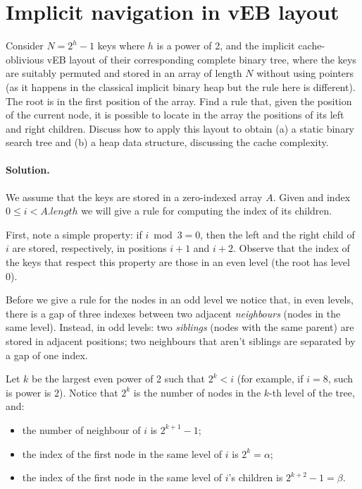 \section{Implicit navigation in vEB layout}
Consider $N = 2^h - 1$ keys where $h$ is a power of 2, and the implicit cache-oblivious vEB layout of their corresponding complete binary tree, where the keys are suitably permuted and stored in an array of length $N$ without using pointers (as it happens in the classical implicit binary heap but the rule here is different). The root is in the first position of the array. Find a rule that, given the position of the current node, it is possible to locate in the array the positions of its left and right children. Discuss how to apply this layout to obtain (a) a static binary search tree and (b) a heap data structure, discussing the cache complexity.

\vspace{0.5cm}
\paragraph{Solution.} We assume that the keys are stored in a zero-indexed array $A$. Given and index $0 \leq i < A.length$ we will give a rule for computing the index of its children.

\begin{center}
\end{center}

First, note a simple property: if $i \bmod 3 = 0$, then the left and the right child of $i$ are stored, respectively, in positions $i+1$ and $i+2$. Observe that the index of the keys that respect this property are those in an even level (the root has level 0).

Before we give a rule for the nodes in an odd level we notice that, in even levels, there is a gap of three indexes between two adjacent \emph{neighbours} (nodes in the same level). Instead, in odd levels: two \emph{siblings} (nodes with the same parent) are stored in adjacent positions; two neighbours that aren't siblings are separated by a gap of one index.

Let $k$ be the largest even power of 2 such that $2^k<i$ (for example, if $i=8$, such is power is $2$). Notice that $2^k$ is the number of nodes in the $k$-th level of the tree, and:
\begin{itemize}
  \item the number of neighbour of $i$ is $2^{k+1}-1$;
  \item the index of the first node in the same level of $i$ is $2^k=\alpha$;
 \item the index of the first node in the same level of $i$'s children is $2^{k+2}-1=\beta$.
\end{itemize}

